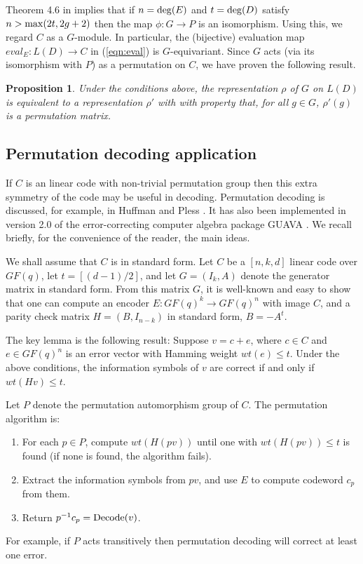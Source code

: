 \documentclass[12pt]{article}
\newtheorem{proposition}[theorem]{Proposition}
\numberwithin{equation}{section}
\begin{document}
Theorem 4.6 in \cite{W} implies that
if $n={\rm deg}(E)$ and
$t={\rm deg}(D)$ satisfy $n>{\rm max}(2t,2g+2)$ then
the map $\phi:G\rightarrow P$ is an isomorphism.
Using this, we regard $C$ as a $G$-module.
In particular, the (bijective) evaluation map 
$eval_E:L(D)\rightarrow C$ in (\ref{eqn:eval})
is $G$-equivariant.
Since $G$ acts (via its isomorphism with $P$) as a permutation
on $C$, we have proven the following result.

\begin{proposition}
Under the conditions above, the representation $\rho$ of $G$ on $L(D)$
is equivalent to a representation $\rho'$ with with property that,
for all $g\in G$, $\rho'(g)$ is a permutation matrix.

\end{proposition}

\subsection{Permutation decoding application}

If $C$ is an linear code with non-trivial permutation group
then this extra symmetry of the code may be useful in 
decoding.
Permutation decoding is discussed, for example, in 
Huffman and Pless \cite{HP}. It has also been implemented
in version 2.0 of the error-correcting computer
algebra package GUAVA \cite{GUAVA}. We recall briefly, for the
convenience of the reader, the main ideas.

We shall assume that $C$ is in standard form.
Let $C$ be a $[n,k,d]$ linear code over $GF(q)$,
let $t=[(d-1)/2]$, and let $G=(I_k,A)$ denote the generator matrix
in standard form. From this matrix $G$, it is well-known and easy to
show that one can compute
an encoder $E:GF(q)^k\rightarrow GF(q)^n$ with
image $C$, and a parity check matrix $H=(B,I_{n-k})$ 
in standard form, $B=-A^t$.

The key lemma is the following result: 
Suppose $v=c+e$, where $c\in C$ and $e\in GF(q)^n$
is an error vector with Hamming weight $wt(e)\leq t$. 
Under the above conditions,
the information symbols of $v$ are correct if and only if 
$wt(Hv)\leq t$. 

Let $P$ denote the permutation automorphism group of $C$. 
The permutation algorithm is:

\begin{enumerate}
\item
For each $p\in P$, compute $wt(H(pv))$ until one with
$wt(H(pv))\leq t$ is found (if none is found, the algorithm fails).

\item
Extract the information symbols from $pv$,
and use $E$ to compute codeword $c_p$ from them.

\item
Return $p^{-1}c_p={\rm Decode}(v)$. 
\end{enumerate}
For example, if $P$ acts transitively then 
permutation decoding will correct at least one error. 
\end{document}
